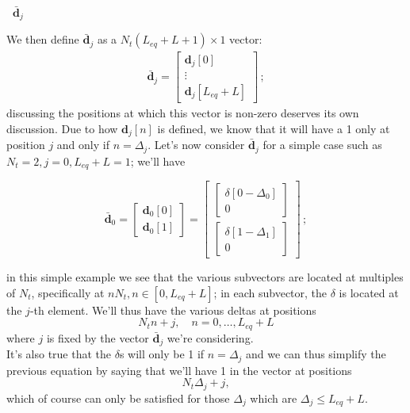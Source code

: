 \documentclass[a4paper, 12pt]{book}
\begin{document}
\noindent
\colorbox{obsidianBlue}{%
    \begin{minipage}{\dimexpr\linewidth-2\fboxsep}
    \textcolor{obsidianTextBlue}{\textbf{\faPen\ $\bar{\mathbf{d}}_j$}}
    
    We then define $\bar{\mathbf{d}}_j$ as a $N_t(L_{eq}+L+1) \times 1$ vector:
    \begin{align}
        \bar{\mathbf{d}}_j = \begin{bmatrix} \mathbf{d}_j[0] \\ \vdots \\ \mathbf{d}_j[L_{eq}+L] \end{bmatrix} \,; \tag{2.135}
    \end{align}
    discussing the positions at which this vector is non-zero deserves its own discussion. Due to how $\mathbf{d}_j[n]$ is defined, we know that it will have a 1 only at
    position $j$ and only if $n = \Delta_j$. Let's now consider $\bar{\mathbf{d}}_j$ for a simple case such as $N_t=2, j=0, L_{eq}+L=1$; we'll have
    
    \[
    \bar{\mathbf{d}}_0 = \begin{bmatrix} \mathbf{d}_0[0] \\ \mathbf{d}_0[1] \end{bmatrix} = 
    \begin{bmatrix} 
        \begin{bmatrix} \delta[0-\Delta_0] \\ 0 \end{bmatrix} \\ 
        \begin{bmatrix} \delta[1-\Delta_1] \\ 0 \end{bmatrix} 
    \end{bmatrix}
    \,;
    \]

    in this simple example we see that the various subvectors are located at multiples of $N_t$, specifically at $nN_t, n \in [0, L_{eq}+L]$; in each subvector, the $\delta$ is located at the $j$-th element. We'll thus have the various deltas at positions
    \[ N_t n + j, \quad n = 0, \dots, L_{eq} + L \]
    where $j$ is fixed by the vector $\bar{\mathbf{d}}_j$ we're considering.\\
    It's also true that the $\delta$s will only be 1 if $n = \Delta_j$ and we can thus simplify the previous equation by saying that we'll have 1 in the vector at positions
    \[ N_t \Delta_j + j, \]
    which of course can only be satisfied for those $\Delta_j$ which are $\Delta_j \leq L_{eq} + L$.
    \end{minipage}%
}
\end{document}
